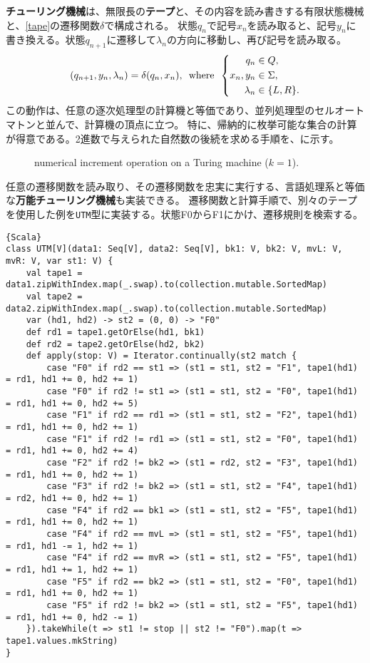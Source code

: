 \documentclass[10pt,a4paper]{book}
\begin{document}
\textbf{チューリング機械}は、無限長の\textbf{テープ}と、その内容を読み書きする有限状態機械と、\eqref{tape}の遷移関数$\delta$で構成される。
状態$q_n$で記号$x_n$を読み取ると、記号$y_n$に書き換える。状態$q_{n+1}$に遷移して$\lambda_n$の方向に移動し、再び記号を読み取る。
%
\begin{equation}
\label{eq:tape}
(q_{n+1},y_n,\lambda_n) = \delta(q_n,x_n),
\enspace\mathrm{where}\enspace
\left\{
\begin{aligned}
q_n &\in Q,\\
x_n,y_n &\in \Sigma,\\
\lambda_n &\in \{L,R\}.
\end{aligned}
\right.
\end{equation}
%
この動作は、任意の逐次処理型の計算機と等価であり、並列処理型のセルオートマトンと並んで、計算機の頂点に立つ。
特に、帰納的に枚挙可能な集合の計算が得意である。2進数で与えられた自然数の後続を求める手順を、に示す。

\begin{figure}[h]
\centering
{}
\caption{numerical increment operation on a Turing machine ($k=1$).\label{fig:tape}}
\end{figure}

任意の遷移関数を読み取り、その遷移関数を忠実に実行する、言語処理系と等価な\textbf{万能チューリング機械}も実装できる。
遷移関数と計算手順で、別々のテープを使用した例を\texttt{UTM}型に実装する。状態F0からF1にかけ、遷移規則を検索する。

\begin{Verbatim}{Scala}
class UTM[V](data1: Seq[V], data2: Seq[V], bk1: V, bk2: V, mvL: V, mvR: V, var st1: V) {
	val tape1 = data1.zipWithIndex.map(_.swap).to(collection.mutable.SortedMap)
	val tape2 = data2.zipWithIndex.map(_.swap).to(collection.mutable.SortedMap)
	var (hd1, hd2) -> st2 = (0, 0) -> "F0"
	def rd1 = tape1.getOrElse(hd1, bk1)
	def rd2 = tape2.getOrElse(hd2, bk2)
	def apply(stop: V) = Iterator.continually(st2 match {
		case "F0" if rd2 == st1 => (st1 = st1, st2 = "F1", tape1(hd1) = rd1, hd1 += 0, hd2 += 1)
		case "F0" if rd2 != st1 => (st1 = st1, st2 = "F0", tape1(hd1) = rd1, hd1 += 0, hd2 += 5)
		case "F1" if rd2 == rd1 => (st1 = st1, st2 = "F2", tape1(hd1) = rd1, hd1 += 0, hd2 += 1)
		case "F1" if rd2 != rd1 => (st1 = st1, st2 = "F0", tape1(hd1) = rd1, hd1 += 0, hd2 += 4)
		case "F2" if rd2 != bk2 => (st1 = rd2, st2 = "F3", tape1(hd1) = rd1, hd1 += 0, hd2 += 1)
		case "F3" if rd2 != bk2 => (st1 = st1, st2 = "F4", tape1(hd1) = rd2, hd1 += 0, hd2 += 1)
		case "F4" if rd2 == bk1 => (st1 = st1, st2 = "F5", tape1(hd1) = rd1, hd1 += 0, hd2 += 1)
		case "F4" if rd2 == mvL => (st1 = st1, st2 = "F5", tape1(hd1) = rd1, hd1 -= 1, hd2 += 1)
		case "F4" if rd2 == mvR => (st1 = st1, st2 = "F5", tape1(hd1) = rd1, hd1 += 1, hd2 += 1)
		case "F5" if rd2 == bk2 => (st1 = st1, st2 = "F0", tape1(hd1) = rd1, hd1 += 0, hd2 += 1)
		case "F5" if rd2 != bk2 => (st1 = st1, st2 = "F5", tape1(hd1) = rd1, hd1 += 0, hd2 -= 1)
	}).takeWhile(t => st1 != stop || st2 != "F0").map(t => tape1.values.mkString)
}
\end{Verbatim}
\end{document}
